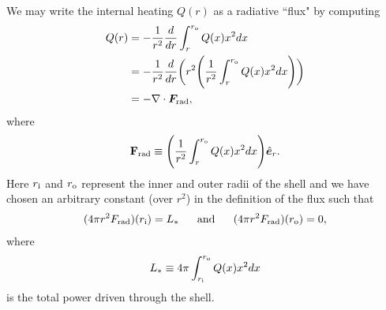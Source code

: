 \documentclass[12pt]{article} %
\newcommand{\ri}{r_{\rm{i}}}
\newcommand{\ro}{r_{\rm{o}}}
\begin{document}
	We may write the internal heating $Q(r)$ as a radiative ``flux" by computing
	\begin{align}
	Q(r) &= -\frac{1}{r^2}\frac{d}{dr}\int_{r}^{{\ro}} Q(x)x^2 dx\nonumber\\
	&= -\frac{1}{r^2}\frac{d}{dr}\bigg{(}r^2\Bigg{(}\frac{1}{r^2}\int_r^{{\ro}}Q(x)x^2dx\Bigg{)}\bigg{)}\nonumber\\
	&= -\nabla\cdot\bm{F}_{\rm{rad}},
	\label{eq:dummy4}
	\end{align}
	where 
	\begin{align}
		\mathbf{F}_{\rm{rad}} \equiv \Bigg{(}\frac{1}{r^2}\int_r^{{\ro}}Q(x)x^2dx\Bigg{)}\hat{\bm{e}}_r.
		\label{eq:radflux}
	\end{align}
	Here ${\ri}$ and ${\ro}$ represent the inner and outer radii of the shell and we have chosen an arbitrary constant (over $r^2$) in the definition of the flux such that 
	\begin{align}
	(4\pi r^2 F_{\rm{rad}})({\ri}) = L_* \ \ \ \ \ \text{and} \ \ \ \ \ (4\pi r^2 F_{\rm{rad}})({\ro}) = 0,
	\end{align}
	where 
	\begin{align}
	L_* \equiv 4\pi\int_{{\ri}}^{{\ro}}Q(x)x^2dx
	\end{align}
	is the total power driven through the shell.
	
\end{document}
